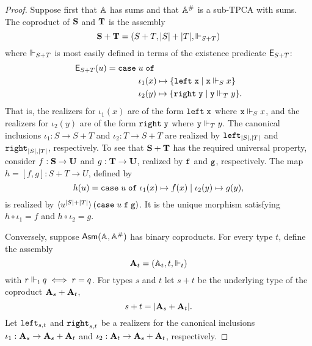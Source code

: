 \begin{proof}
  Suppose first that $\AA$ has sums and that $\compAA$ is a sub-TPCA
  with sums. The coproduct of $\asm{S}$ and $\asm{T}$ is the assembly
  \begin{equation*}
    \asm{S} + \asm{T} = (S + T, |S| + |T|, \rz_{S + T})
  \end{equation*}
  where $\rz_{S+T}$ is most easily defined in terms of the existence
  predicate $\Ex_{S+T}$:
  \begin{equation*}
    \Ex_{S+T}(u) =
    \xcase{u}
    {\iota_1(x)}{\set{\combLeft\;\R{x} \such \R{x} \rz_S x}}
    {\iota_2(y)}{\set{\combRight\;\R{y} \such \R{y} \rz_T y}.}
  \end{equation*}
  That is, the realizers for $\iota_1(x)$ are of the form
  $\combLeft\;\R{x}$ where $\R{x} \rz_S x$, and the realizers for
  $\iota_2(y)$ are of the form $\combRight\;\R{y}$ where $\R{y} \rz_T
  y$. The canonical inclusions $\iota_1 : S \to S + T$ and $\iota_2 :
  T \to S + T$ are realized by $\combLeft_{|S|,|T|}$ and
  $\combRight_{|S|,|T|}$, respectively.
  To see that $\asm{S} + \asm{T}$ has the required universal property,
  consider $f : \asm{S} \to \asm{U}$ and $g : \asm{T} \to \asm{U}$,
  realized by $\R{f}$ and $\R{g}$, respectively. The map $h = [f,g] :
  S + T \to U$, defined by
  \begin{equation*}
    h(u) = \case{u}{\iota_1(x)}{f(x)}{\iota_2(y)}{g(y)},
  \end{equation*}
  is realized by
  $\pcalam{\annot{u}{|S|+|T|}}{\combCase\;u\;\R{f}\;\R{g}}$. It is the
  unique morphism satisfying $h \circ \iota_1 = f$ and $h \circ
  \iota_2 = g$.

  Conversely, suppose $\AsmA$ has binary coproducts. For every type
  $t$, define the assembly
  \begin{equation*}
    \asm{A}_t = (\Atyp{t}, t, {\rz_t})
  \end{equation*}
  with $r \rz_t q \iff r = q$. For types $s$ and $t$ let $s+t$ be the
  underlying type of the coproduct $\asm{A}_s + \asm{A}_t$,
  \begin{equation*}
    s + t = |\asm{A}_s + \asm{A}_t|.
  \end{equation*}
  Let $\combLeft_{s,t}$ and $\combRight_{s,t}$ be a realizers for the
  canonical inclusions $\iota_1 : \asm{A}_s \to \asm{A}_s + \asm{A}_t$
  and $\iota_2 : \asm{A}_t \to \asm{A}_s + \asm{A}_t$, respectively.


\end{proof}

